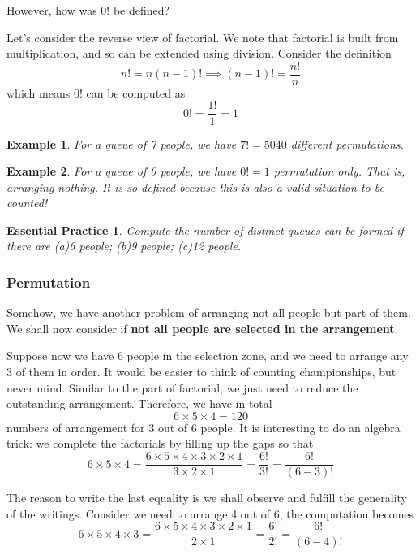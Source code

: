 \documentclass[12pt]{article}
\newtheorem*{example}{Example}
\newtheorem{exercise}{Essential Practice}[subsection]
\begin{document}
    However, how was $0!$ be defined?

    Let's consider the reverse view of factorial. We note that factorial is built from multiplication, and so can be extended using division. Consider the definition $$n!=n(n-1)! \implies (n-1)!=\frac{n!}{n}$$
    which means $0!$ can be computed as $$0!=\frac{1!}{1}=1$$

    \begin{example}
        For a queue of 7 people, we have $7!=5040$ different permutations.
    \end{example}

    \begin{example}
        For a queue of 0 people, we have $0!=1$ permutation only. That is, arranging nothing. It is so defined because this is also a valid situation to be counted!
    \end{example}

    \begin{exercise}
        Compute the number of distinct queues can be formed if there are (a)6 people; (b)9 people; (c)12 people.
    \end{exercise}

    \subsubsection*{Permutation}

    Somehow, we have another problem of arranging not all people but part of them. We shall now consider if \textbf{not all people are selected in the arrangement}.

    Suppose now we have 6 people in the selection zone, and we need to arrange any 3 of them in order. It would be easier to think of counting championships, but never mind. Similar to the part of factorial, we just need to reduce the outstanding arrangement. Therefore, we have in total $$6\times 5 \times 4 = 120$$ numbers of arrangement for 3 out of 6 people. It is interesting to do an algebra trick: we complete the factorials by filling up the gaps so that $$6\times 5 \times 4 = \frac{6\times 5\times 4\times 3\times 2\times 1}{3\times 2\times 1}=\frac{6!}{3!}=\frac{6!}{(6-3)!}$$

    The reason to write the last equality is we shall observe and fulfill the generality of the writings. Consider we need to arrange 4 out of 6, the computation becomes $$6\times 5 \times 4 \times 3= \frac{6\times 5\times 4\times 3\times 2\times 1}{2\times 1}=\frac{6!}{2!}=\frac{6!}{(6-4)!}$$
\end{document}
